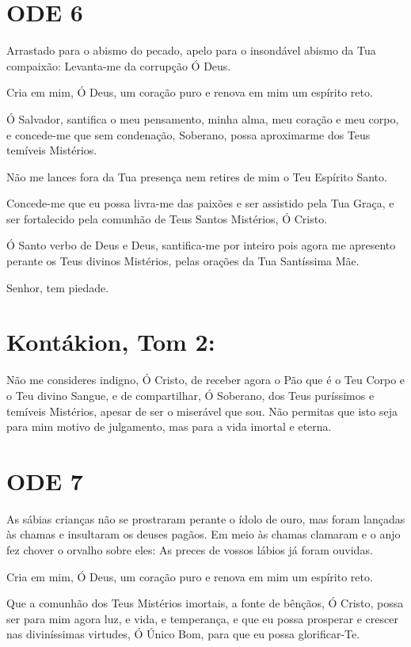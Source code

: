 \documentclass{subfiles}
\begin{document}
\section*{ODE 6}

\eirmos{}Arrastado para o abismo do pecado, apelo para o insondável abismo da
Tua compaixão: Levanta-me da corrupção Ó Deus.

Cria em mim, Ó Deus, um coração puro e renova em mim um espírito reto.

Ó Salvador, santifica o meu pensamento, minha alma, meu coração e meu corpo, e
concede-me que sem condenação, Soberano, possa aproximarme dos Teus temíveis
Mistérios.

Não me lances fora da Tua presença nem retires de mim o Teu Espírito Santo.

Concede-me que eu possa livra-me das paixões e ser assistido pela Tua Graça,
e ser fortalecido pela comunhão de Teus Santos Mistérios, Ó Cristo.

\Doxology{}

Ó Santo verbo de Deus e Deus, santifica-me por inteiro pois agora me apresento
perante os Teus divinos Mistérios, pelas orações da Tua Santíssima Mãe.

Senhor, tem piedade. 

\Doxology{}

\section*{Kontákion, Tom 2:}

Não me consideres indigno, Ó Cristo, de receber agora o Pão que é o Teu Corpo e
o Teu divino Sangue, e de compartilhar, Ó Soberano, dos Teus puríssimos e
temíveis Mistérios, apesar de ser o miserável que sou. Não permitas que isto
seja para mim motivo de julgamento, mas para a vida imortal e eterna.

\section*{ODE 7}

\eirmos{}As sábias crianças não se prostraram perante o ídolo de ouro, mas
foram lançadas às chamas e insultaram os deuses pagãos. Em meio às chamas
clamaram e o anjo fez chover o orvalho sobre eles: As preces de vossos lábios
já foram ouvidas.

Cria em mim, Ó Deus, um coração puro e renova em mim um espírito reto.

Que a comunhão dos Teus Mistérios imortais, a fonte de bênçãos, Ó
Cristo, possa ser para mim agora luz, e vida, e temperança, e que eu possa
prosperar e crescer nas diviníssimas virtudes, Ó Único Bom, para que eu possa
glorificar-Te.
\end{document}
